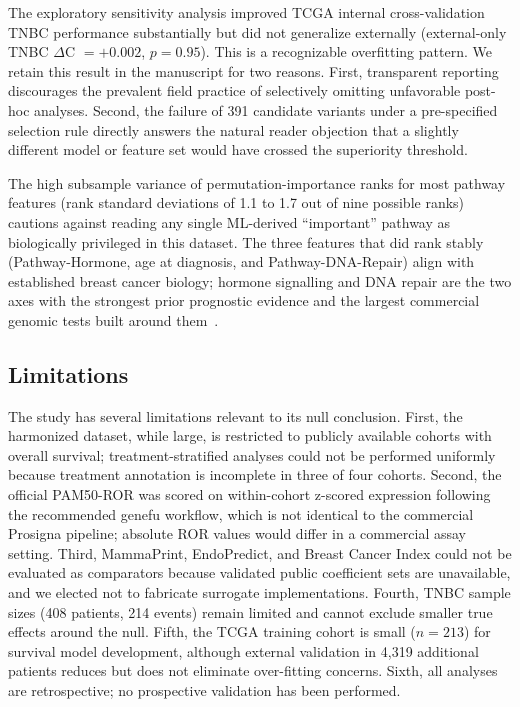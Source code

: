 \documentclass[11pt,letterpaper]{article}
\begin{document}
The exploratory sensitivity analysis improved TCGA internal cross-validation TNBC performance substantially but did not generalize externally (external-only TNBC $\Delta$C $= +0.002$, $p = 0.95$). This is a recognizable overfitting pattern. We retain this result in the manuscript for two reasons. First, transparent reporting discourages the prevalent field practice of selectively omitting unfavorable post-hoc analyses. Second, the failure of 391 candidate variants under a pre-specified selection rule directly answers the natural reader objection that a slightly different model or feature set would have crossed the superiority threshold.

The high subsample variance of permutation-importance ranks for most pathway features (rank standard deviations of 1.1 to 1.7 out of nine possible ranks) cautions against reading any single ML-derived ``important'' pathway as biologically privileged in this dataset. The three features that did rank stably (Pathway-Hormone, age at diagnosis, and Pathway-DNA-Repair) align with established breast cancer biology; hormone signalling and DNA repair are the two axes with the strongest prior prognostic evidence and the largest commercial genomic tests built around them~\cite{paik2004multigene,vantveer2002gene}.

\subsection*{Limitations}

The study has several limitations relevant to its null conclusion. First, the harmonized dataset, while large, is restricted to publicly available cohorts with overall survival; treatment-stratified analyses could not be performed uniformly because treatment annotation is incomplete in three of four cohorts. Second, the official PAM50-ROR was scored on within-cohort z-scored expression following the recommended genefu workflow, which is not identical to the commercial Prosigna pipeline; absolute ROR values would differ in a commercial assay setting. Third, MammaPrint, EndoPredict, and Breast Cancer Index could not be evaluated as comparators because validated public coefficient sets are unavailable, and we elected not to fabricate surrogate implementations. Fourth, TNBC sample sizes (408 patients, 214 events) remain limited and cannot exclude smaller true effects around the null. Fifth, the TCGA training cohort is small ($n = 213$) for survival model development, although external validation in 4,319 additional patients reduces but does not eliminate over-fitting concerns. Sixth, all analyses are retrospective; no prospective validation has been performed.
\end{document}
